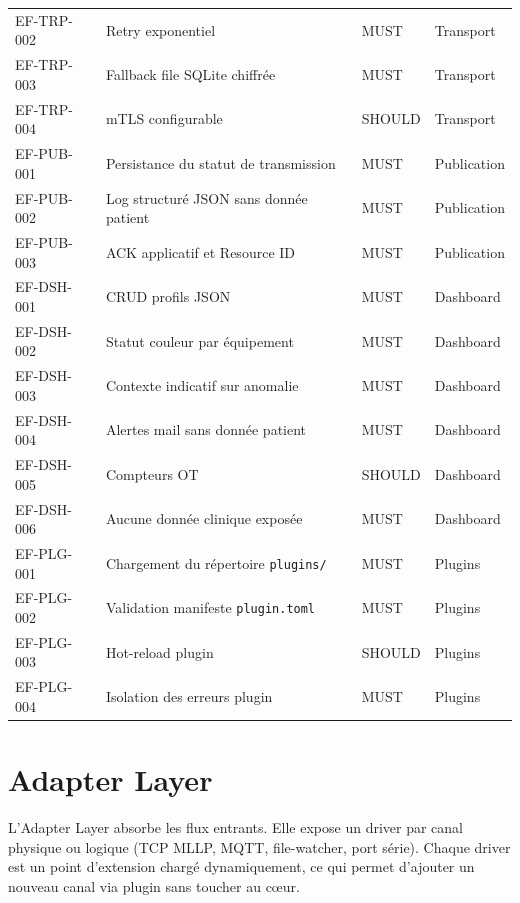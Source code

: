 \begin{longtable}{p{2.5cm}p{7.5cm}p{1.5cm}p{2.8cm}}
  EF-TRP-002 & Retry exponentiel                           & MUST   & Transport \\
  EF-TRP-003 & Fallback file SQLite chiffrée               & MUST   & Transport \\
  EF-TRP-004 & mTLS configurable                           & SHOULD & Transport \\
  EF-PUB-001 & Persistance du statut de transmission       & MUST   & Publication \\
  EF-PUB-002 & Log structuré JSON sans donnée patient      & MUST   & Publication \\
  EF-PUB-003 & ACK applicatif et Resource ID               & MUST   & Publication \\
  EF-DSH-001 & CRUD profils JSON                           & MUST   & Dashboard \\
  EF-DSH-002 & Statut couleur par équipement               & MUST   & Dashboard \\
  EF-DSH-003 & Contexte indicatif sur anomalie             & MUST   & Dashboard \\
  EF-DSH-004 & Alertes mail sans donnée patient            & MUST   & Dashboard \\
  EF-DSH-005 & Compteurs OT                                & SHOULD & Dashboard \\
  EF-DSH-006 & Aucune donnée clinique exposée              & MUST   & Dashboard \\
  EF-PLG-001 & Chargement du répertoire \texttt{plugins/}  & MUST   & Plugins \\
  EF-PLG-002 & Validation manifeste \texttt{plugin.toml}   & MUST   & Plugins \\
  EF-PLG-003 & Hot-reload plugin                           & SHOULD & Plugins \\
  EF-PLG-004 & Isolation des erreurs plugin                & MUST   & Plugins \\
\end{longtable}

\section{Adapter Layer}
\label{sec:ef-adapter}

L'Adapter Layer absorbe les flux entrants. Elle expose un driver par canal physique ou logique (TCP MLLP, MQTT, file-watcher, port série). Chaque driver est un point d'extension chargé dynamiquement, ce qui permet d'ajouter un nouveau canal via plugin sans toucher au cœur.

